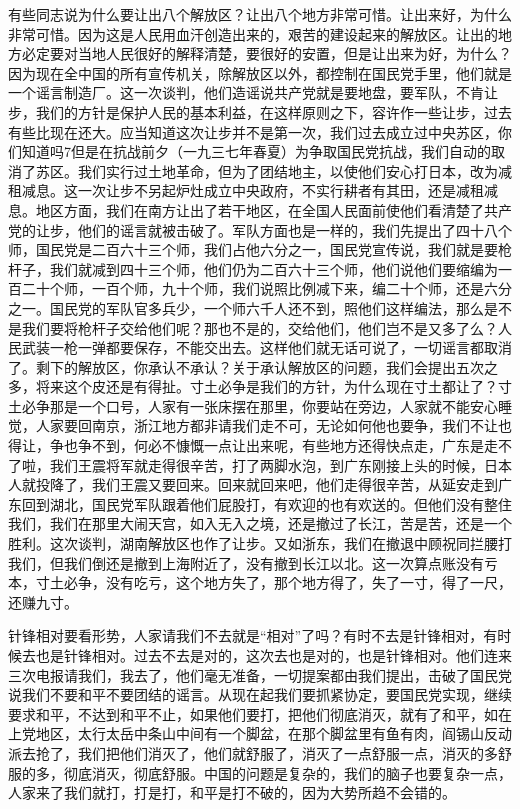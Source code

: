 有些同志说为什么要让出八个解放区？让出八个地方非常可惜。让出来好，为什么非常可惜。因为这是人民用血汗创造出来的，艰苦的建设起来的解放区。让出的地方必定要对当地人民很好的解释清楚，要很好的安置，但是让出来为好，为什么？因为现在全中国的所有宣传机关，除解放区以外，都控制在国民党手里，他们就是一个谣言制造厂。这一次谈判，他们造谣说共产党就是要地盘，要军队，不肯让步，我们的方针是保护人民的基本利益，在这样原则之下，容许作一些让步，过去有些比现在还大。应当知道这次让步并不是第一次，我们过去成立过中央苏区，你们知道吗7但是在抗战前夕（一九三七年春夏）为争取国民党抗战，我们自动的取消了苏区。我们实行过土地革命，但为了团结地主，以使他们安心打日本，改为减租减息。这一次让步不另起炉灶成立中央政府，不实行耕者有其田，还是减租减息。地区方面，我们在南方让出了若干地区，在全国人民面前使他们看清楚了共产党的让步，他们的谣言就被击破了。军队方面也是一样的，我们先提出了四十八个师，国民党是二百六十三个师，我们占他六分之一，国民党宣传说，我们就是要枪杆子，我们就减到四十三个师，他们仍为二百六十三个师，他们说他们要缩编为一百二十个师，一百个师，九十个师，我们说照比例减下来，编二十个师，还是六分之一。国民党的军队官多兵少，一个师六千人还不到，照他们这样编法，那么是不是我们要将枪杆子交给他们呢？那也不是的，交给他们，他们岂不是又多了么？人民武装一枪一弹都要保存，不能交出去。这样他们就无话可说了，一切谣言都取消了。剩下的解放区，你承认不承认？关于承认解放区的问题，我们会提出五次之多，将来这个皮还是有得扯。寸土必争是我们的方针，为什么现在寸土都让了？寸土必争那是一个口号，人家有一张床摆在那里，你要站在旁边，人家就不能安心睡觉，人家要回南京，浙江地方都非请我们走不可，无论如何他也要争，我们不让也得让，争也争不到，何必不慷慨一点让出来呢，有些地方还得快点走，广东是走不了啦，我们王震将军就走得很辛苦，打了两脚水泡，到广东刚接上头的时候，日本人就投降了，我们王震又要回来。回来就回来吧，他们走得很辛苦，从延安走到广东回到湖北，国民党军队跟着他们屁股打，有欢迎的也有欢送的。但他们没有整住我们，我们在那里大闹天宫，如入无入之境，还是撤过了长江，苦是苦，还是一个胜利。这次谈判，湖南解放区也作了让步。又如浙东，我们在撤退中顾祝同拦腰打我们，但我们倒还是撤到上海附近了，没有撤到长江以北。这一次算点账没有亏本，寸土必争，没有吃亏，这个地方失了，那个地方得了，失了一寸，得了一尺，还赚九寸。

针锋相对要看形势，人家请我们不去就是“相对”了吗？有时不去是针锋相对，有时候去也是针锋相对。过去不去是对的，这次去也是对的，也是针锋相对。他们连来三次电报请我们，我去了，他们毫无准备，一切提案都由我们提出，击破了国民党说我们不要和平不要团结的谣言。从现在起我们要抓紧协定，要国民党实现，继续要求和平，不达到和平不止，如果他们要打，把他们彻底消灭，就有了和平，如在上党地区，太行太岳中条山中间有一个脚盆，在那个脚盆里有鱼有肉，阎锡山反动派去抢了，我们把他们消灭了，他们就舒服了，消灭了一点舒服一点，消灭的多舒服的多，彻底消灭，彻底舒服。中国的问题是复杂的，我们的脑子也要复杂一点，人家来了我们就打，打是打，和平是打不破的，因为大势所趋不会错的。

